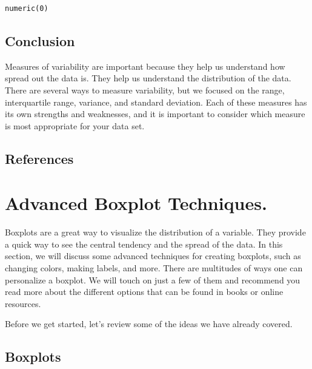 \documentclass[
  letterpaper,
  DIV=11,
  numbers=noendperiod]{scrreprt}
\begin{document}
\begin{verbatim}
numeric(0)
\end{verbatim}

\section*{Conclusion}\label{conclusion-3}


Measures of variability are important because they help us understand
how spread out the data is. They help us understand the distribution of
the data. There are several ways to measure variability, but we focused
on the range, interquartile range, variance, and standard deviation.
Each of these measures has its own strengths and weaknesses, and it is
important to consider which measure is most appropriate for your data
set.

\section*{References}\label{references}



\chapter*{Advanced Boxplot
Techniques.}\label{advanced-boxplot-techniques.}


Boxplots are a great way to visualize the distribution of a variable.
They provide a quick way to see the central tendency and the spread of
the data. In this section, we will discuss some advanced techniques for
creating boxplots, such as changing colors, making labels, and more.
There are multitudes of ways one can personalize a boxplot. We will
touch on just a few of them and recommend you read more about the
different options that can be found in books or online resources.

Before we get started, let's review some of the ideas we have already
covered.

\section*{Boxplots}\label{boxplots}
\end{document}

